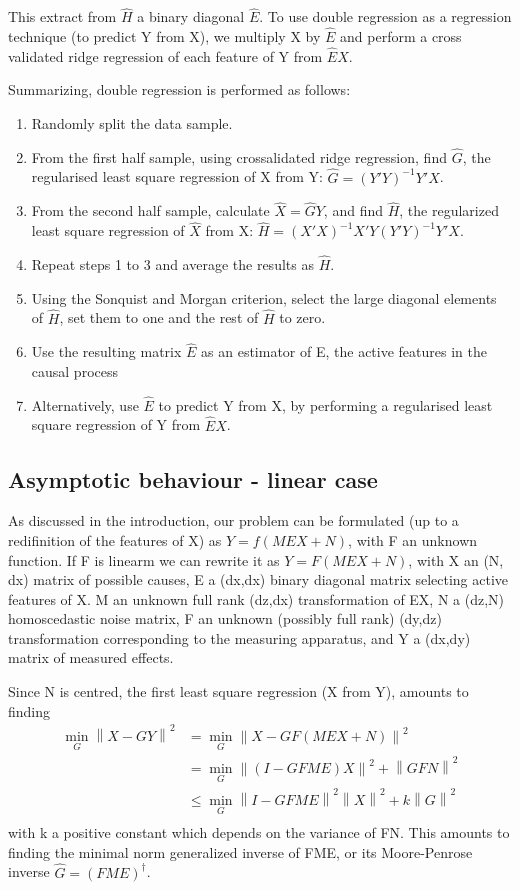 \documentclass{article}
\begin{document}
This extract from $\hat H$ a binary diagonal $\hat E$. To use double regression as a regression technique (to predict Y from X), we multiply X by $\hat E$ and perform a cross validated ridge regression of each feature of Y from $\hat E X$.

Summarizing, double regression is performed as follows:
\begin{enumerate}
\item Randomly split the data sample.
\item From the first half sample, using crossalidated ridge regression, find $\hat G$, the regularised least square regression of X from Y: $\hat G=(Y'Y)^{-1} Y'X$.
\item From the second half sample, calculate $\hat X = \hat G Y$, and find $\hat H$, the regularized least square regression of $\hat X$ from X: $\hat H=(X'X)^{-1} X'Y(Y'Y)^{-1} Y'X$.
\item Repeat steps 1 to 3 and average the results as $\hat H$.
\item Using the Sonquist and Morgan criterion, select the large diagonal elements of $\hat H$, set them to one and the rest of $\hat  H$ to zero.
\item Use the resulting matrix $\hat E$ as an estimator of E, the active features in the causal process
\item Alternatively, use $\hat E$ to predict Y from X, by performing a regularised least square regression of Y from $\hat E X$. 
\end{enumerate}

\subsection{Asymptotic behaviour - linear case}
As discussed in the introduction, our problem can be formulated (up to a redifinition of the features of X) as $Y=f(MEX+N)$, with F an unknown function. If F is linearm we can rewrite it as $Y = F(MEX + N)$, with X an (N, dx) matrix of possible causes, E a (dx,dx) binary diagonal matrix selecting active features of X. M an unknown full rank (dz,dx) transformation of EX, N a (dz,N) homoscedastic noise matrix, F an unknown (possibly full rank) (dy,dz) transformation corresponding to the measuring apparatus, and Y a (dx,dy) matrix of measured effects.

Since N is centred, the first least square regression (X from Y), amounts to finding
\begin{equation}
\begin{aligned}
\min_G \left \| X-GY \right \|^2 &= \min_G \left \| X - GF(MEX+N)\right\|^2 \\
&{}= \min_G \left \| (I-GFME)X\right\| ^2 + \left \| GFN\right \| ^2\\
&{}\leq \min_G \left \| I-GFME\right\| ^2 \left \| X\right\| ^2 + k\left \| G\right \| ^2\\ 
\end{aligned}
\end{equation}
with k a positive constant which depends on the variance of FN. This amounts to finding the minimal norm generalized inverse of FME, or its Moore-Penrose inverse $\hat  G= (FME)^{\dagger}$.
\end{document}
